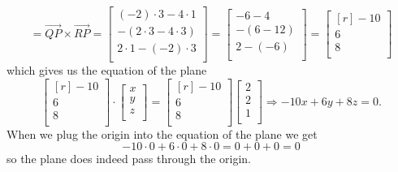 \documentclass[../main.tex]{subfiles}
\begin{document}
\begin{enumerate}[a)]
\[			=
			\overrightarrow{QP}
			\times
			\overrightarrow{RP}
			=
			\begin{bmatrix}
				(-2)\cdot3 - 4\cdot1 \\
				-(2\cdot3 - 4\cdot3) \\
				2\cdot1 - (-2)\cdot3 \\
			\end{bmatrix}
			=
			\begin{bmatrix}
				-6 - 4 \\
				-(6 - 12) \\
				2 - (-6) \\
			\end{bmatrix}
			=
			\begin{bmatrix*}[r]
				-10 \\
				6 \\
				8 \\
			\end{bmatrix*}
		\]
		which gives us the equation of the plane
		\[
			\begin{bmatrix*}[r]
				-10 \\
				6 \\
				8 \\
			\end{bmatrix*}
			\cdot
			\begin{bmatrix}
				x \\
				y \\
				z \\
			\end{bmatrix}
			=
			\begin{bmatrix*}[r]
				-10 \\
				6 \\
				8 \\
			\end{bmatrix*}
			\begin{bmatrix}
				2 \\
				2 \\
				1 \\
			\end{bmatrix}
			\Rightarrow
			-10x + 6y + 8z
			=
			0.
		\]
		When we plug the origin into the equation of the plane we get
		\[
			-10\cdot0 + 6\cdot0 + 8\cdot0 = 0 + 0 + 0 = 0
		\]
		so the plane does indeed pass through the origin.
\end{enumerate}
\end{document}

